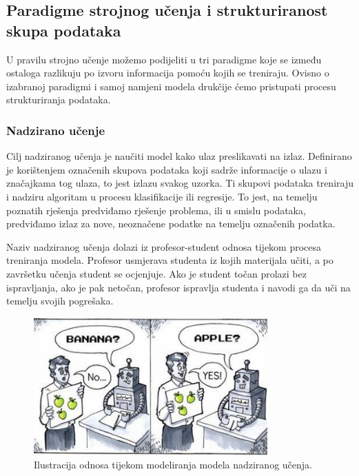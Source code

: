 \documentclass[times, utf8, zavrsni, numeric]{fer}
\begin{document}
\subsection{Paradigme strojnog učenja i strukturiranost skupa podataka}

U pravilu strojno učenje možemo podijeliti u tri paradigme koje se između ostaloga razlikuju po izvoru informacija pomoću kojih se treniraju. Ovisno o izabranoj paradigmi i samoj namjeni modela drukčije ćemo pristupati procesu strukturiranja podataka.

\subsubsection{Nadzirano učenje}

Cilj nadziranog učenja je naučiti model kako ulaz preslikavati na izlaz. Definirano je korištenjem označenih skupova podataka koji sadrže informacije o ulazu i značajkama tog ulaza, to jest izlazu svakog uzorka. Ti skupovi podataka treniraju i \glqq nadziru\grqq{} algoritam u procesu klasifikacije ili regresije. To jest, na temelju poznatih rješenja predviđamo rješenje problema, ili u smislu podataka, predviđamo izlaz za nove, neoznačene podatke na temelju označenih podatka. 

Naziv nadziranog učenja dolazi iz profesor-student odnosa tijekom procesa treniranja modela. Profesor usmjerava studenta iz kojih materijala učiti, a po završetku učenja student se ocjenjuje. Ako je student točan prolazi bez ispravljanja, ako je pak netočan, profesor ispravlja studenta i navodi ga da uči na temelju svojih pogrešaka.

\begin{figure}[H]
    \centering
    \includegraphics[width=0.8\textwidth]{pictures/nadzirano_ucenje.jpg}
    \caption{Ilustracija odnosa tijekom modeliranja modela nadziranog učenja. \citep{nadzirano_slika}}
    \label{nadzirano_ucenje_slika}
\end{figure}
\end{document}
